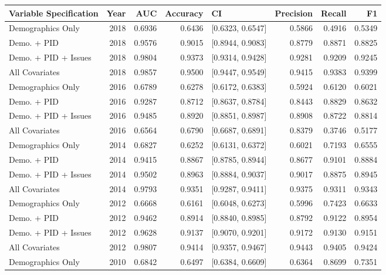 \begin{table}[ht]
\centering
\begin{tabular}{lrrrlrrr}
  \toprule
Variable Specification & Year & AUC & Accuracy & CI & Precision & Recall & F1 \\ 
  \midrule
Demographics Only & 2018 & 0.6936 & 0.6436 & [0.6323, 0.6547] & 0.5866 & 0.4916 & 0.5349 \\ 
  Demo. + PID & 2018 & 0.9576 & 0.9015 & [0.8944, 0.9083] & 0.8779 & 0.8871 & 0.8825 \\ 
  Demo. + PID + Issues & 2018 & 0.9804 & 0.9373 & [0.9314, 0.9428] & 0.9281 & 0.9209 & 0.9245 \\ 
  All Covariates & 2018 & 0.9857 & 0.9500 & [0.9447, 0.9549] & 0.9415 & 0.9383 & 0.9399 \\ 
  Demographics Only & 2016 & 0.6789 & 0.6278 & [0.6172, 0.6383] & 0.5924 & 0.6120 & 0.6021 \\ 
  Demo. + PID & 2016 & 0.9287 & 0.8712 & [0.8637, 0.8784] & 0.8443 & 0.8829 & 0.8632 \\ 
  Demo. + PID + Issues & 2016 & 0.9485 & 0.8920 & [0.8851, 0.8987] & 0.8908 & 0.8722 & 0.8814 \\ 
  All Covariates & 2016 & 0.6564 & 0.6790 & [0.6687, 0.6891] & 0.8379 & 0.3746 & 0.5177 \\ 
  Demographics Only & 2014 & 0.6827 & 0.6252 & [0.6131, 0.6372] & 0.6021 & 0.7193 & 0.6555 \\ 
  Demo. + PID & 2014 & 0.9415 & 0.8867 & [0.8785, 0.8944] & 0.8677 & 0.9101 & 0.8884 \\ 
  Demo. + PID + Issues & 2014 & 0.9502 & 0.8963 & [0.8884, 0.9037] & 0.9017 & 0.8875 & 0.8945 \\ 
  All Covariates & 2014 & 0.9793 & 0.9351 & [0.9287, 0.9411] & 0.9375 & 0.9311 & 0.9343 \\ 
  Demographics Only & 2012 & 0.6668 & 0.6161 & [0.6048, 0.6273] & 0.5996 & 0.7423 & 0.6633 \\ 
  Demo. + PID & 2012 & 0.9462 & 0.8914 & [0.8840, 0.8985] & 0.8792 & 0.9122 & 0.8954 \\ 
  Demo. + PID + Issues & 2012 & 0.9628 & 0.9137 & [0.9070, 0.9201] & 0.9172 & 0.9130 & 0.9151 \\ 
  All Covariates & 2012 & 0.9807 & 0.9414 & [0.9357, 0.9467] & 0.9443 & 0.9405 & 0.9424 \\ 
  Demographics Only & 2010 & 0.6842 & 0.6497 & [0.6384, 0.6609] & 0.6364 & 0.8699 & 0.7351 \\ 

\end{tabular}
\end{table}
